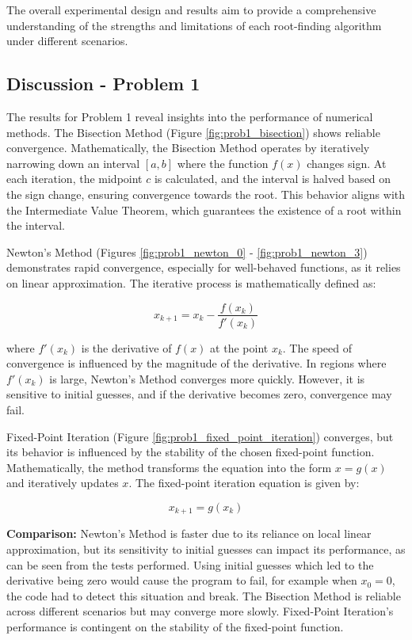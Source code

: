 \documentclass[12pt, letterpaper]{article}
\begin{document}
The overall experimental design and results aim to provide a comprehensive understanding of the strengths and limitations of each root-finding algorithm under different scenarios.

\subsection*{Discussion - Problem 1}

The results for Problem 1 reveal insights into the performance of numerical methods. The Bisection Method (Figure \ref{fig:prob1_bisection}) shows reliable convergence. Mathematically, the Bisection Method operates by iteratively narrowing down an interval \( [a, b] \) where the function \(f(x)\) changes sign. At each iteration, the midpoint \(c\) is calculated, and the interval is halved based on the sign change, ensuring convergence towards the root. This behavior aligns with the Intermediate Value Theorem, which guarantees the existence of a root within the interval.

Newton's Method (Figures \ref{fig:prob1_newton_0} - \ref{fig:prob1_newton_3}) demonstrates rapid convergence, especially for well-behaved functions, as it relies on linear approximation. The iterative process is mathematically defined as:

\[
x_{k+1} = x_k - \frac{f(x_k)}{f'(x_k)}
\]

where \(f'(x_k)\) is the derivative of \(f(x)\) at the point \(x_k\). The speed of convergence is influenced by the magnitude of the derivative. In regions where \(f'(x_k)\) is large, Newton's Method converges more quickly. However, it is sensitive to initial guesses, and if the derivative becomes zero, convergence may fail.

Fixed-Point Iteration (Figure \ref{fig:prob1_fixed_point_iteration}) converges, but its behavior is influenced by the stability of the chosen fixed-point function. Mathematically, the method transforms the equation into the form \(x = g(x)\) and iteratively updates \(x\). The fixed-point iteration equation is given by:

\[
x_{k+1} = g(x_k)
\]

\textbf{Comparison:} Newton's Method is faster due to its reliance on local linear approximation, but its sensitivity to initial guesses can impact its performance, as can be seen from the tests performed. Using initial guesses which led to the derivative being zero would cause the program to fail, for example when \(x_0 = 0\), the code had to detect this situation and break. The Bisection Method is reliable across different scenarios but may converge more slowly. Fixed-Point Iteration's performance is contingent on the stability of the fixed-point function.
\end{document}
